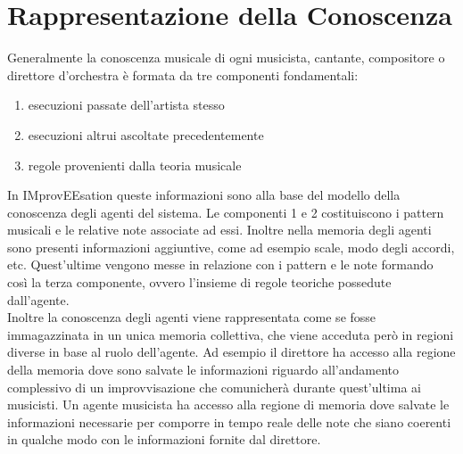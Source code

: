 \section{Rappresentazione della Conoscenza}
Generalmente la conoscenza musicale di ogni musicista, cantante,
compositore o direttore d'orchestra è formata da tre 
componenti fondamentali:
\begin{enumerate}
\item esecuzioni passate dell'artista stesso
\item esecuzioni altrui ascoltate precedentemente
\item regole provenienti dalla teoria musicale
\end{enumerate}

In IMprovEEsation queste informazioni sono alla base del modello della
conoscenza degli agenti del sistema. Le componenti 1 e 2 costituiscono i
pattern musicali e le relative note associate ad essi. Inoltre nella memoria
degli agenti sono presenti informazioni aggiuntive, come ad esempio
scale, modo degli accordi, etc. Quest'ultime vengono messe in relazione
con i pattern e le note formando così la terza componente, ovvero l'insieme 
di regole teoriche possedute dall'agente.\\ 
Inoltre la conoscenza degli agenti viene rappresentata come se fosse 
immagazzinata in un unica memoria collettiva, che viene acceduta però in
regioni diverse in base al ruolo dell'agente. Ad esempio il direttore ha
accesso alla regione della memoria dove sono salvate le informazioni
riguardo all'andamento complessivo di un improvvisazione che comunicherà
durante quest'ultima ai musicisti. Un agente musicista ha accesso alla
regione di memoria dove salvate le informazioni necessarie per comporre
in tempo reale delle note che siano coerenti in qualche modo con le
informazioni fornite dal direttore.
